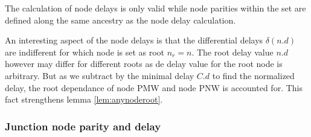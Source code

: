 \begin{lemma}\label{lem:nodecalc_ancestrypath}
 The calculation of node delays is only valid while node parities within the set are defined along the same ancestry as the node delay calculation.
\end{lemma}

An interesting aspect of the node delays is that the differential delays $\delta(n.d)$ are indifferent for which node is set as root $n_r = n$. The root delay value $n.d$ however may differ for different roots as de delay value for the root node is arbitrary. But as we subtract by the minimal delay $C.d$ to find the normalized delay, the root dependance of node PMW and node PNW is accounted for. This fact strengthens lemma \ref{lem:anynoderoot}.

\subsubsection{Junction node parity and delay}

